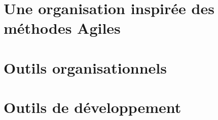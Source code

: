 \section{Une organisation inspirée des méthodes Agiles}
\section{Outils organisationnels}
\section{Outils de développement}
